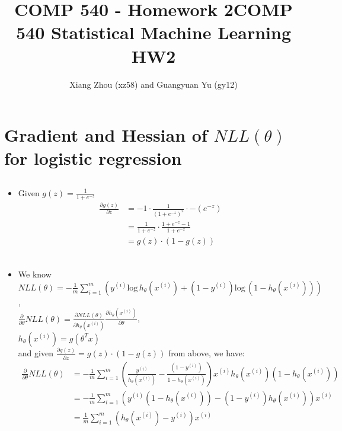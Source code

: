 \documentclass[pdftex,11pt]{article}
\begin{document}
\title{COMP 540 - Homework 2}
\author{Xiang Zhou (xz58) and Guangyuan Yu (gy12)}
\title{COMP 540 Statistical Machine Learning HW2}
\maketitle
\newcommand{\pr}{\mathbb{P}}
\section{Gradient and Hessian of $NLL(\theta)$ for logistic regression}
	
	\subsection{}
	\begin{itemize}
	\item
	Given $g(z) = \frac{1}{1 + e^{-z}}$
	\begin{align*}
		\frac{\partial g(z)}{\partial z} &=-1\cdot\frac{1}{(1 + e^{-z})^{2}}\cdot-(e^{-z})\\
						&=\frac{1}{1+e^{-z}}\cdot\frac{1+e^{-z}-1}{1+e^{-z}}\\
						&=g(z)\cdot(1 - g(z))\\
	\end{align*}	
	\end{itemize}
	
	
	\subsection{}
	\begin{itemize}
	\item
	We know $NLL(\theta) = -\frac{1}{m}\sum_{i = 1}^{m} \left( y^{(i)}\text{log}\,h_{\theta}(x^{(i)}) + (1 - y^{(i)})\text{log}\,(1 - h_{\theta}(x^{(i)})) \right)$, 
	\\$\frac{\partial} {\partial \theta} NLL(\theta)= \frac{\partial NLL(\theta)}{\partial h_{\theta}(x^{(i)})} \frac{\partial h_{\theta}(x^{(i)})}{\partial \theta} $, \\
	$h_{\theta}(x^{(i)}) = g(\theta^Tx)$\\
	and given $\frac{\partial g(z)}{\partial z} =g(z)\cdot(1 - g(z))$ from above, we have:\\
	\begin{align*}
		\frac{\partial} {\partial \theta} NLL(\theta) 
		&= -\frac{1}{m}\sum_{i = 1}^{m} \left( \frac{y^{(i)}}{h_{\theta}(x^{(i)})} - \frac{(1 - y^{(i)})}{1 - h_{\theta}(x^{(i)})}\right) x^{(i)} h_{\theta}(x^{(i)})(1 - h_{\theta}(x^{(i)})) \\
			&= -\frac{1}{m}\sum_{i = 1}^{m} (y^{(i)}(1 - h_{\theta}(x^{(i)})) - (1 - y^{(i)})h_{\theta}(x^{(i)}))x^{(i)} \\
			&= \frac{1}{m}\sum_{i = 1}^{m} (h_{\theta}(x^{(i)}) - y^{(i)}) x^{(i)}\\
	\end{align*}
	\end{itemize}
\end{document}
